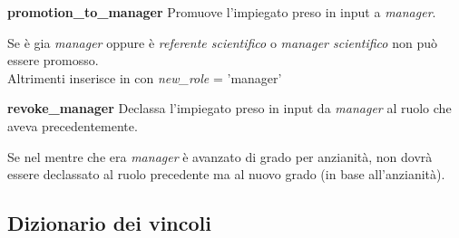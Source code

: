 \newpage
\noindent \textbf{promotion\_to\_manager}\sskip
Promuove l'impiegato preso in input a \textit{manager}.

Se è gia \textit{manager} oppure è \textit{referente scientifico} o \textit{manager scientifico} non può essere promosso. \\
Altrimenti inserisce in \textit{\careerlog} con \textit{new\_role} = 'manager'
\bigskip

\newpage
\noindent \textbf{revoke\_manager}\sskip
Declassa l'impiegato preso in input da \textit{manager} al ruolo che aveva precedentemente.

Se nel mentre che era \textit{manager} è avanzato di grado per anzianità, non dovrà essere declassato al ruolo precedente ma al nuovo grado (in base all'anzianità).


\subsection{Dizionario dei vincoli}
